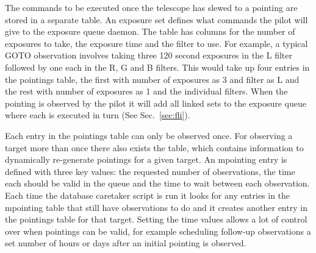\begin{colsection}
\begin{colsection}
The commands to be executed once the telescope has slewed to a pointing are stored in a separate  table. An exposure set defines what commands the pilot will give to the exposure queue daemon. The table has columns for the number of exposures to take, the exposure time and the filter to use. For example, a typical GOTO observation involves taking three 120 second exposures in the L filter followed by one each in the R, G and B filters. This would take up four entries in the pointings table, the first with number of exposures as 3 and filter as L and the rest with number of exposures as 1 and the individual filters. When the pointing is observed by the pilot it will add all linked sets to the exposure queue where each is executed in turn (See Sec.~\ref{sec:fli}).

Each entry in the pointings table can only be observed once. For observing a target more than once there also exists the  table, which contains information to dynamically re-generate pointings for a given target. An mpointing entry is defined with three key values: the requested number of observations, the time each should be valid in the queue and the time to wait between each observation. Each time the database caretaker script is run it looks for any entries in the mpointing table that still have observations to do and it creates another entry in the pointings table for that target. Setting the time values allows a lot of control over when pointings can be valid, for example scheduling follow-up observations a set number of hours or days after an initial pointing is observed.


\end{colsection}
\end{colsection}
